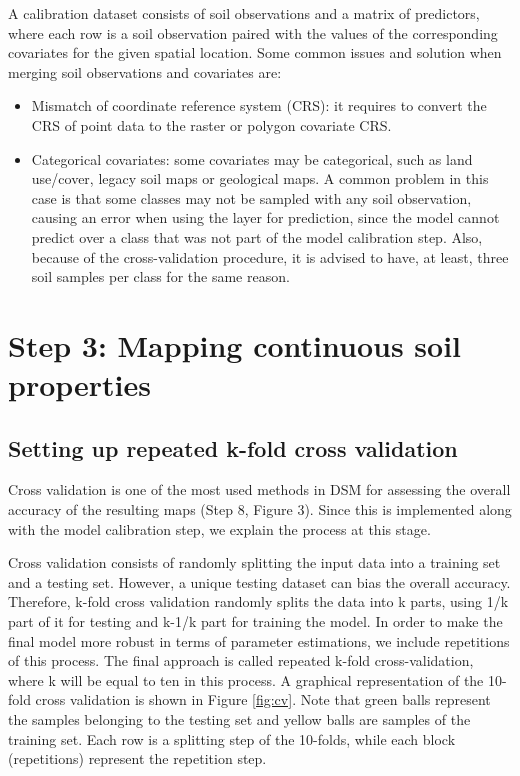 \documentclass[
  10pt,
  b5paper,
  oneside]{book}
\providecommand{\tightlist}{%
  \setlength{\itemsep}{0pt}\setlength{\parskip}{0pt}}
\begin{document}
A calibration dataset consists of soil observations and a matrix of predictors, where each row is a soil observation paired with the values of the corresponding covariates for the given spatial location. Some common issues and solution when merging soil observations and covariates are:

\begin{itemize}
\tightlist
\item
  Mismatch of coordinate reference system (CRS): it requires to convert the CRS of point data to the raster or polygon covariate CRS.
\item
  Categorical covariates: some covariates may be categorical, such as land use/cover, legacy soil maps or geological maps. A common problem in this case is that some classes may not be sampled with any soil observation, causing an error when using the layer for prediction, since the model cannot predict over a class that was not part of the model calibration step. Also, because of the cross-validation procedure, it is advised to have, at least, three soil samples per class for the same reason.
\end{itemize}

\hypertarget{step-3-mapping-continuous-soil-properties}{%
\chapter{Step 3: Mapping continuous soil properties}\label{step-3-mapping-continuous-soil-properties}}

\hypertarget{setting-up-repeated-k-fold-cross-validation}{%
\section{Setting up repeated k-fold cross validation}\label{setting-up-repeated-k-fold-cross-validation}}

Cross validation is one of the most used methods in DSM for assessing the overall accuracy of the resulting maps (Step 8, Figure 3). Since this is implemented along with the model calibration step, we explain the process at this stage.

Cross validation consists of randomly splitting the input data into a training set and a testing set. However, a unique testing dataset can bias the overall accuracy. Therefore, k-fold cross validation randomly splits the data into k parts, using 1/k part of it for testing and k-1/k part for training the model. In order to make the final model more robust in terms of parameter estimations, we include repetitions of this process. The final approach is called repeated k-fold cross-validation, where k will be equal to ten in this process. A graphical representation of the 10-fold cross validation is shown in Figure \ref{fig:cv}. Note that green balls represent the samples belonging to the testing set and yellow balls are samples of the training set. Each row is a splitting step of the 10-folds, while each block (repetitions) represent the repetition step.
\end{document}
